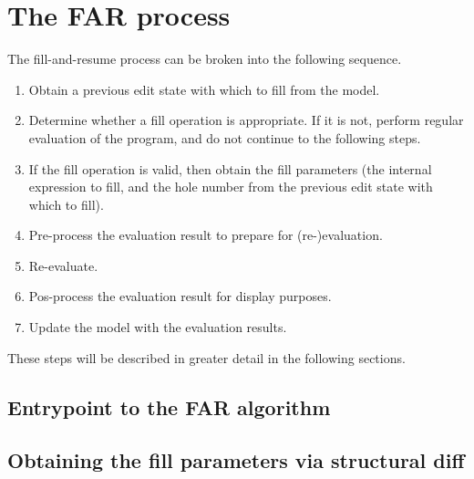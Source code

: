 \section{The FAR process}
\label{sec:far-process}

The fill-and-resume process can be broken into the following sequence.

\begin{enumerate}
\item Obtain a previous edit state with which to fill from the model.
\item Determine whether a fill operation is appropriate. If it is not, perform regular evaluation of the program, and do not continue to the following steps.
\item If the fill operation is valid, then obtain the fill parameters (the internal expression to fill, and the hole number from the previous edit state with which to fill).
\item Pre-process the evaluation result to prepare for (re-)evaluation.
\item Re-evaluate.
\item Pos-process the evaluation result for display purposes.
\item Update the model with the evaluation results.
\end{enumerate}

These steps will be described in greater detail in the following sections.

\subsection{Entrypoint to the FAR algorithm}
\label{sec:far-entrypoint}

\subsection{Obtaining the fill parameters via structural diff}
\label{sec:obtaining-fill-parameters}

